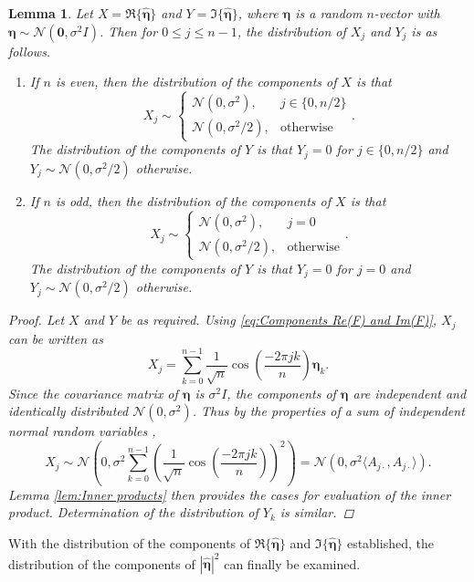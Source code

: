 \documentclass[12pt]{article}
\newcommand{\noiseSD}{\sigma}	%
\newcommand{\noise}{\bm{\eta}}	%
\newtheorem{lemma}{Lemma}[section]
\begin{document}
\begin{lemma}
\label{lem:Component distributions}
Let $X = \Re\{\widehat{\noise}\}$ and $Y = \Im\{\widehat{\noise}\}$, where $\noise$ is a random $n$-vector with $\noise \sim \mathcal{N}(\bm{0},\noiseSD^2 I)$. Then for $0 \leq j \leq n-1$, the distribution of $X_j$ and $Y_j$ is as follows.  
\begin{enumerate}[label=(\roman*)]
\item If $n$ is even, then the distribution of the components of $X$ is that
\[X_j \sim \begin{cases}
\mathcal{N}(0,\noiseSD^2), & j \in \{0,n/2\} \\
\mathcal{N}(0,\noiseSD^2/2), & \text{otherwise} \end{cases}.\]
The distribution of the components of $Y$ is that $Y_j = 0$ for $j \in \{0,n/2\}$ and $Y_j \sim \mathcal{N}(0,\noiseSD^2/2)$ otherwise.
\item If $n$ is odd, then the distribution of the components of $X$ is that
\[X_j \sim \begin{cases}
\mathcal{N}(0,\noiseSD^2), & j = 0 \\
\mathcal{N}(0,\noiseSD^2/2), & \text{otherwise} \end{cases}.\]
The distribution of the components of $Y$ is that $Y_j = 0$ for $j = 0$ and $Y_j \sim \mathcal{N}(0,\noiseSD^2/2)$ otherwise.
\end{enumerate}
\begin{proof}
Let $X$ and $Y$ be as required. Using \eqref{eq:Components Re(F) and Im(F)}, $X_j$ can be written as
\[X_j = \sum_{k=0}^{n-1} \frac{1}{\sqrt{n}}\cos\left(\frac{-2\pi{jk}}{n}\right)\noise_k.\]
Since the covariance matrix of $\noise$ is $\noiseSD^2 I$, the components of $\noise$ are independent and identically distributed $\mathcal{N}(0,\noiseSD^2)$. Thus by the properties of a sum of independent normal random variables \cite{CasellaBerger02},
\[X_j \sim \mathcal{N}\left(0, \noiseSD^2\sum_{k=0}^{n-1} \left(\frac{1}{\sqrt{n}}\cos\left(\frac{-2\pi{jk}}{n}\right)\right)^2\right) = \mathcal{N}\left(0, \noiseSD^2 \langle A_{j\cdot},A_{j\cdot} \rangle\right).\]
Lemma \ref{lem:Inner products} then provides the cases for evaluation of the inner product. Determination of the distribution of $Y_k$ is similar.
\end{proof}
\end{lemma}

With the distribution of the components of $\Re\{\widehat{\noise}\}$ and $\Im\{\widehat{\noise}\}$ established, the distribution of the components of $|\widehat{\noise}|^2$ can finally be examined.
\end{document}
